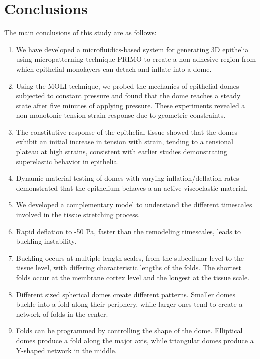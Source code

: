 
\hypertarget{conclusions}{%
	\section{Conclusions}\label{conclusions}}

The main conclusions of this study are as follows:

\begin{enumerate}
	\def\labelenumi{\arabic{enumi}.}
	\item We have developed a microfluidics-based system for generating 3D epithelia using micropatterning technique PRIMO to create a non-adhesive region from which epithelial monolayers can detach and inflate into a dome.
	\item Using the MOLI technique, we probed the mechanics of epithelial domes subjected to constant pressure and found that the dome reaches a steady state after five minutes of applying pressure. These experiments revealed a non-monotonic tension-strain response due to geometric constraints.
	\item The constitutive response of the epithelial tissue showed that the domes exhibit an initial increase in tension with strain, tending to a tensional plateau at high strains, consistent with earlier studies demonstrating superelastic behavior in epithelia.
	\item Dynamic material testing of domes with varying inflation/deflation rates demonstrated that the epithelium behaves a an active viscoelastic material.
	\item We developed a complementary model to understand the different timescales involved in the tissue stretching process.
	\item Rapid deflation to -50 Pa, faster than the remodeling timescales, leads to buckling instability.
	\item Buckling occurs at multiple length scales, from the subcellular level to the tissue level, with differing characteristic lengths of the folds. The shortest folds occur at the membrane cortex level and the longest at the tissue scale.
	\item Different sized spherical domes create different patterns. Smaller domes buckle into a fold along their periphery, while larger ones tend to create a network of folds in the center.
	\item Folds can be programmed by controlling the shape of the dome. Elliptical domes produce a fold along the major axis, while triangular domes produce a Y-shaped network in the middle.
\end{enumerate}

